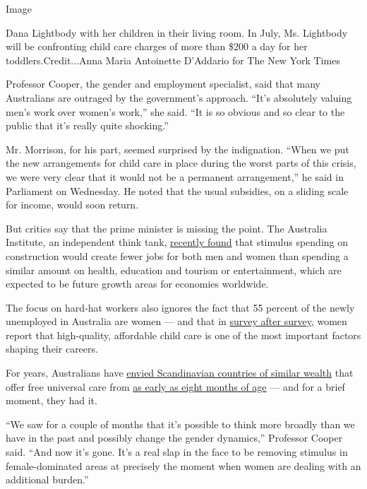 Image

Dana Lightbody with her children in their living room. In July, Ms.
Lightbody will be confronting child care charges of more than \$200 a
day for her toddlers.Credit...Anna Maria Antoinette D'Addario for The
New York Times

Professor Cooper, the gender and employment specialist, said that many
Australians are outraged by the government's approach. ``It's absolutely
valuing men's work over women's work,'' she said. ``It is so obvious and
so clear to the public that it's really quite shocking.''

Mr. Morrison, for his part, seemed surprised by the indignation. ``When
we put the new arrangements for child care in place during the worst
parts of this crisis, we were very clear that it would not be a
permanent arrangement,'' he said in Parliament on Wednesday. He noted
that the usual subsidies, on a sliding scale for income, would soon
return.

But critics say that the prime minister is missing the point. The
Australia Institute, an independent think tank,
\href{https://www.tai.org.au/content/new-analysis-more-women-unemployed-yet-stimulus-favours-male-dominated-industries}{recently
found} that stimulus spending on construction would create fewer jobs
for both men and women than spending a similar amount on health,
education and tourism or entertainment, which are expected to be future
growth areas for economies worldwide.

The focus on hard-hat workers also ignores the fact that 55 percent of
the newly unemployed in Australia are women --- and that in
\href{https://www.abc.net.au/news/2019-07-30/working-mothers-more-stressed-than-fathers-report-finds/11365632}{survey
after survey}, women report that high-quality, affordable child care is
one of the most important factors shaping their careers.

For years, Australians have
\href{https://www.smh.com.au/education/looking-to-swedish-model-of-childcare-and-education-20150518-gh48hj.html}{envied
Scandinavian countries of similar wealth} that offer free universal care
from
\href{https://www.weforum.org/agenda/2019/03/nordic-nations-best-places-for-parents-children/\#:~:text=Finland\%20provides\%20free\%20universal\%20daycare,formal\%20education\%20at\%20age\%20seven.\&text=In\%20Sweden\%2C\%20parents\%20are\%20entitled,at\%2080\%25\%20of\%20their\%20salary}{as
early as eight months of age} --- and for a brief moment, they had it.

``We saw for a couple of months that it's possible to think more broadly
than we have in the past and possibly change the gender dynamics,''
Professor Cooper said. ``And now it's gone. It's a real slap in the face
to be removing stimulus in female-dominated areas at precisely the
moment when women are dealing with an additional burden.''


